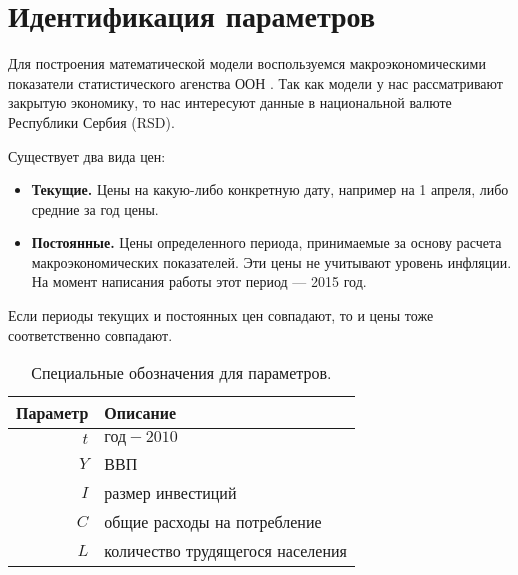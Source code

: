 \chapter{Идентификация параметров}
\label{cha:ident_params}

Для построения математической модели воспользуемся макроэкономическими показатели статистического агенства ООН \cite{unstat}.
Так как модели у нас рассматривают закрытую экономику, то нас интересуют данные в национальной валюте Республики Сербия (RSD).

Существует два вида цен:
\begin{itemize}
	\item \textbf{Текущие.}
	Цены на какую-либо конкретную дату, например на 1 апреля, либо средние за год цены.
	\item \textbf{Постоянные.}
	Цены определенного периода, принимаемые за основу расчета макроэкономических показателей.
	Эти цены не учитывают уровень инфляции.
	На момент написания работы этот период --- 2015 год.
\end{itemize}
Если периоды текущих и постоянных цен совпадают, то и цены тоже соответственно совпадают.

\begin{table}[ht]
	\centering
	\caption{Специальные обозначения для параметров.}
	\begin{tabular}{|r|l|}
	\hline
	\multicolumn{1}{|r|}{Параметр} & \multicolumn{1}{l|}{Описание} \\ \hline
	$t$                          & $\text{год} - 2010$                                            \\
	$Y$                          & ВВП                                                   \\
	$I$                          & размер инвестиций                                     \\
	$C$                          & общие расходы на потребление                          \\
	$L$                          & количество трудящегося населения\footnotemark         \\ \hline
	\end{tabular}
	\label{tab:desig_of_params}
\end{table}

